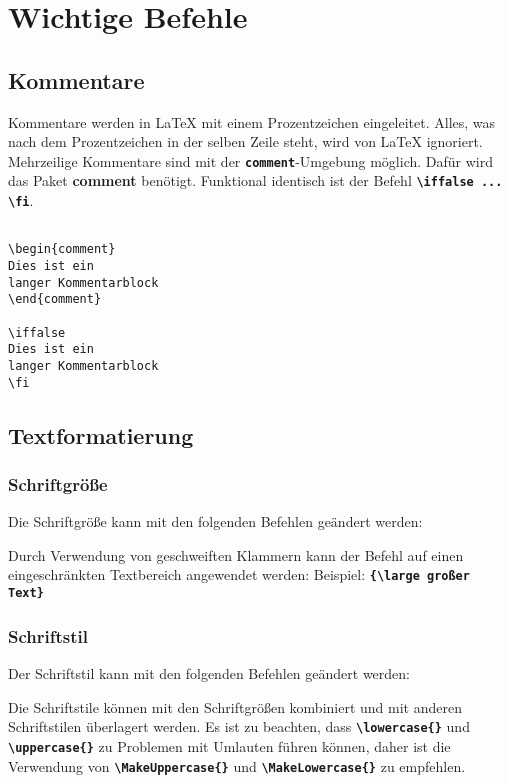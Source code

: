\section{Wichtige Befehle}
\subsection{Kommentare}
Kommentare werden in \LaTeX{} mit einem Prozentzeichen eingeleitet. Alles, was nach dem Prozentzeichen in der selben Zeile steht, wird von \LaTeX{} ignoriert. Mehrzeilige Kommentare sind mit der \texttt{\textbf{comment}}-Umgebung möglich. Dafür wird das Paket \textbf{comment} benötigt. Funktional identisch ist der Befehl \textbf{\texttt{\textbackslash iffalse ... \textbackslash fi}}.

\begin{lstlisting}[language={[LaTeX]TeX}, basicstyle=\small\ttfamily]
% Dies ist ein einzeiliger Kommentar
    
\begin{comment}
Dies ist ein
langer Kommentarblock
\end{comment}

\iffalse
Dies ist ein
langer Kommentarblock
\fi
\end{lstlisting}

\subsection{Textformatierung}
\subsubsection{Schriftgröße}
Die Schriftgröße kann mit den folgenden Befehlen geändert werden:



Durch Verwendung von geschweiften Klammern kann der Befehl auf einen eingeschränkten Textbereich angewendet werden:
Beispiel: \textbf{\texttt{\{\textbackslash large großer Text\}}}

\subsubsection{Schriftstil}
Der Schriftstil kann mit den folgenden Befehlen geändert werden:



Die Schriftstile können mit den Schriftgrößen kombiniert und mit anderen Schriftstilen überlagert werden.
Es ist zu beachten, dass \textbf{\texttt{\textbackslash lowercase\{\}}} und \textbf{\texttt{\textbackslash uppercase\{\}}} zu Problemen mit Umlauten führen können, daher ist die Verwendung von \textbf{\texttt{\textbackslash MakeUppercase\{\}}} und \textbf{\texttt{\textbackslash MakeLowercase\{\}}} zu empfehlen.

